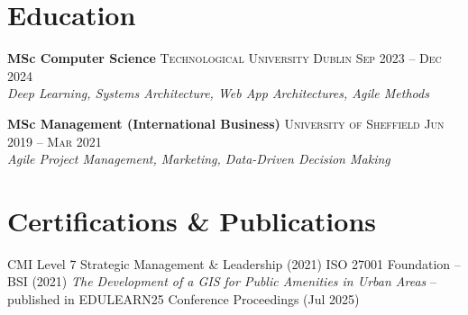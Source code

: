 \documentclass{simpleresume}
\begin{document}
\section{Education}
\noindent\textbf{MSc Computer Science}
  \hfill{\sffamily\scshape\small\color{secondary}Technological University Dublin}
  \hfill{\sffamily\scshape\small\color{muted}Sep 2023 -- Dec 2024}\\
  {\itshape\color{secondary}Deep Learning, Systems Architecture, Web App Architectures, Agile Methods}

\vspace{0.05cm}
\noindent\textbf{MSc Management (International Business)}
  \hfill{\sffamily\scshape\small\color{secondary}University of Sheffield}
  \hfill{\sffamily\scshape\small\color{muted}Jun 2019 -- Mar 2021}\\
  {\itshape\color{secondary}Agile Project Management, Marketing, Data-Driven Decision Making}

\section{Certifications \& Publications}
\noindent
{\sffamily\small\color{secondary}
  CMI Level 7 Strategic Management \& Leadership (2021) \quad\textbullet\quad
  ISO 27001 Foundation -- BSI (2021) \quad\textbullet\quad
  \textit{The Development of a GIS for Public Amenities in Urban Areas} -- published in EDULEARN25 Conference Proceedings (Jul 2025)
}
\end{document}
